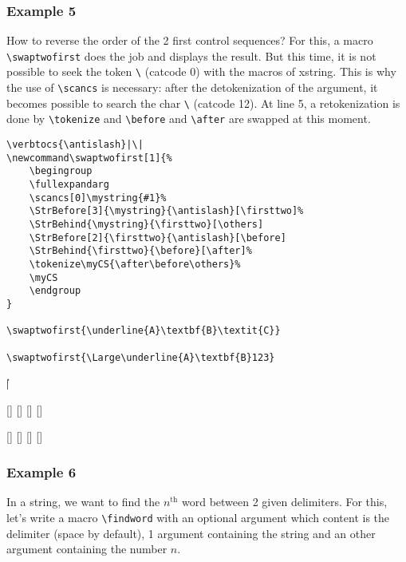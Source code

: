 \documentclass[english,a4paper,10pt]{article}
\renewcommand\th{${}^\text{th}$\xspace}
\newcommand\Xstring{\textsf{xstring}\xspace}
\newcommand\styleexercice{\footnotesize}
\newcommand\verbinline{\lstinline[basicstyle=\normalsize\ttfamily]}
\begin{document}
\subsubsection{Example 5}
How to reverse the order of the 2 first control sequences? For this, a macro \verb|\swaptwofirst| does the job and displays the result. But this time, it is not possible to seek the token \verb|\| (catcode 0) with the macros of \Xstring. This is why the use of \verbinline|\scancs| is necessary: after the detokenization of the argument, it becomes possible to search the char \verb|\| (catcode 12). At line 5, a retokenization is done by \verbinline|\tokenize| and \verb|\before| and \verb|\after| are swapped at this moment.\medskip

\begin{minipage}[c]{0.65\linewidth}
\begin{lstlisting}
\verbtocs{\antislash}|\|
\newcommand\swaptwofirst[1]{%
	\begingroup
	\fullexpandarg
	\scancs[0]\mystring{#1}%
	\StrBefore[3]{\mystring}{\antislash}[\firsttwo]%
	\StrBehind{\mystring}{\firsttwo}[\others]
	\StrBefore[2]{\firsttwo}{\antislash}[\before]
	\StrBehind{\firsttwo}{\before}[\after]%
	\tokenize\myCS{\after\before\others}%
	\myCS
	\endgroup
}

\swaptwofirst{\underline{A}\textbf{B}\textit{C}}

\swaptwofirst{\Large\underline{A}\textbf{B}123}
\end{lstlisting}%
\end{minipage}\hfill
\begin{minipage}[c]{0.35\linewidth}
	\styleexercice
	\verbtocs{\antislash}|\|
	\newcommand\swaptwofirst[1]{%
		\begingroup
		\fullexpandarg
		\scancs[0]\mystring{#1}%
		\StrBefore[3]{\mystring}{\antislash}[\firsttwo]%
		\StrBehind{\mystring}{\firsttwo}[\others]
		\StrBefore[2]{\firsttwo}{\antislash}[\before]
		\StrBehind{\firsttwo}{\before}[\after]%
		\tokenize\myCS{\after\before\others}%
		\myCS
		\endgroup
	}

	\swaptwofirst{\underline{A}\textbf{B}\textit{C}}

	\swaptwofirst{\Large\underline{A}\textbf{B}123}
\end{minipage}%


\subsubsection{Example 6}
In a string, we want to find the $n$\th{} word between 2 given delimiters. For this, let's write a macro \verb|\findword| with an optional argument which content is the delimiter (space by default), 1 argument containing the string and an other argument containing the number $n$.\medskip
\end{document}
